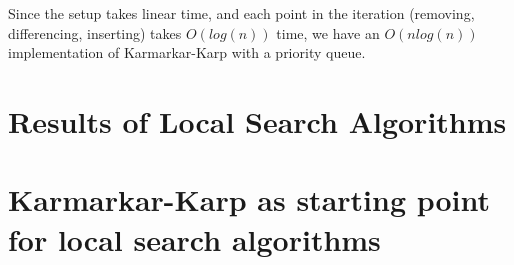 \documentclass[11pt]{article}
\begin{document}
Since the setup takes linear time, and each point in the iteration (removing, differencing, inserting) takes $O(log(n))$ time, we have an $O(nlog(n))$ implementation of Karmarkar-Karp with a priority queue.

\section{Results of Local Search Algorithms}

\section{Karmarkar-Karp as starting point for local search algorithms}
\end{document}
